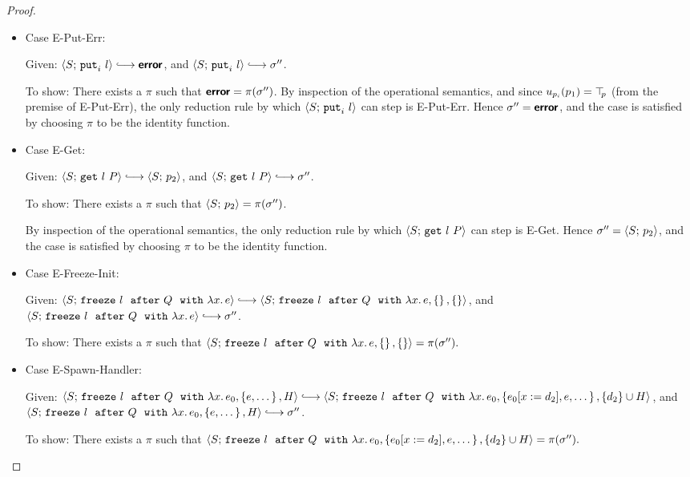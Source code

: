 \begin{proof}
\begin{itemize}
  \item Case {\sc E-Put-Err}:

    Given: $\config{S}{\putiexp{l}} \parstepsto \error$, and
    $\config{S}{\putiexp{l}} \parstepsto \conf''$.

    To show: There exists a $\pi$ such that $\textbf{\textsf{error}} = \pi(\sigma'')$.
    By inspection of the operational semantics, and since
    $u_{p_i}(p_1) = \top\hspace{-0.85mm}_{p}$ (from the premise of {\sc E-Put-Err}), the
    only reduction rule by which $\langle S;\, \mbox{\texttt{put}}_i~l \rangle$ can step is
    {\sc E-Put-Err}.  Hence $\sigma'' = \textbf{\textsf{error}}$, and the case is
    satisfied by choosing $\pi$ to be the identity function.

  \item Case {\sc E-Get}:

    Given: $\config{S}{\getexp{l}{P}} \parstepsto \config{S}{p_2}$,
    and $\config{S}{\getexp{l}{P}} \parstepsto \conf''$.

    To show: There exists a $\pi$ such that $\langle S;\, p_2 \rangle =
    \pi(\sigma'')$.

    By inspection of the operational semantics, the only reduction
    rule by which $\langle S;\, \mbox{\texttt{get}}~l~P \rangle$ can step is {\sc E-Get}.
    Hence $\sigma'' = \langle S;\, p_2 \rangle$, and the case is satisfied by
    choosing $\pi$ to be the identity function.

  \item Case {\sc E-Freeze-Init}:

    Given: $\config{S}{\freezeafter{l}{Q}{\lam{x}{e}}} \parstepsto
    \config{S}{\freezeafterfull{l}{Q}{\lam{x}{e}}{\setof{}}{\setof{}}}$,
    and $\config{S}{\freezeafter{l}{Q}{\lam{x}{e}}} \parstepsto \conf''$.

    To show: There exists a $\pi$ such that
    $\langle S;\, \mbox{\texttt{freeze}}~l~~{\mbox{\texttt{after}}}~Q~~{\mbox{\texttt{with}}}~\lambda x.\,e, \left\{\right\}, \left\{\right\} \rangle
    = \pi(\sigma'').$


  \item Case {\sc E-Spawn-Handler}:

    Given: $\config{S}{\freezeafterfull{l}{Q}{\lam{x}{e_0}}{\setof{e,
          \dots}}{H}} \parstepsto
    \config{S}{\freezeafterfull{l}{Q}{\lam{x}{e_0}}{\setof{\subst{e_0}{x}{d_2},
          e, \dots}} {\{d_2\}\cup H}}$, and
    $\config{S}{\freezeafterfull{l}{Q}{\lam{x}{e_0}}{\setof{e,
          \dots}}{H}} \parstepsto \conf''$.

    To show: There exists a $\pi$ such that
    $\langle S;\, \mbox{\texttt{freeze}}~l~~{\mbox{\texttt{after}}}~Q~~{\mbox{\texttt{with}}}~\lambda x.\,e_0, \left\{e_0[x := d_2],
          e, \dots\right\}, \{d_2\}\cup H \rangle = \pi(\sigma'').$


\end{itemize}
\end{proof}
